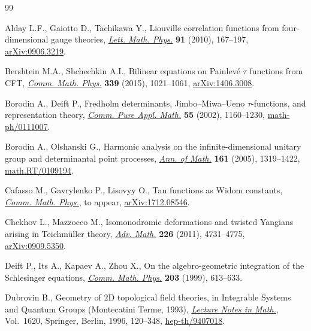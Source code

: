 \documentclass[pdftex]{sigma}
\numberwithin{equation}{section}
\begin{document}
\begin{thebibliography}{99}
\footnotesize\itemsep=0pt

Alday L.F., Gaiotto D., Tachikawa Y., Liouville correlation functions from
 four-dimensional gauge theories, \href{https://doi.org/10.1007/s11005-010-0369-5}{\textit{Lett. Math. Phys.}} \textbf{91}
 (2010), 167--197, \href{https://arxiv.org/abs/0906.3219}{arXiv:0906.3219}.

Bershtein M.A., Shchechkin A.I., Bilinear equations on {P}ainlev\'{e} {$\tau$}
 functions from {CFT}, \href{https://doi.org/10.1007/s00220-015-2427-4}{\textit{Comm. Math. Phys.}} \textbf{339} (2015),
 1021--1061, \href{https://arxiv.org/abs/1406.3008}{arXiv:1406.3008}.

Borodin A., Deift P., Fredholm determinants, {J}imbo--{M}iwa--{U}eno
 {$\tau$}-functions, and representation theory, \href{https://doi.org/10.1002/cpa.10042}{\textit{Comm. Pure Appl.
 Math.}} \textbf{55} (2002), 1160--1230, \href{https://arxiv.org/abs/math-ph/0111007}{math-ph/0111007}.

Borodin A., Olshanski G., Harmonic analysis on the infinite-dimensional unitary
 group and determinantal point processes, \href{https://doi.org/10.4007/annals.2005.161.1319}{\textit{Ann. of Math.}} \textbf{161}
 (2005), 1319--1422, \href{https://arxiv.org/abs/math.RT/0109194}{math.RT/0109194}.

Cafasso M., Gavrylenko P., Lisovyy O., Tau functions as {W}idom constants,
 \href{https://doi.org/10.1007/s00220-018-3230-9}{\textit{Comm. Math. Phys.}}, {t}o appear, \href{https://arxiv.org/abs/1712.08546}{arXiv:1712.08546}.

Chekhov L., Mazzocco M., Isomonodromic deformations and twisted {Y}angians
 arising in {T}eichm\"{u}ller theory, \href{https://doi.org/10.1016/j.aim.2010.12.017}{\textit{Adv. Math.}} \textbf{226} (2011),
 4731--4775, \href{https://arxiv.org/abs/0909.5350}{arXiv:0909.5350}.

Deift P., Its A., Kapaev A., Zhou X., On the algebro-geometric integration of
 the {S}chlesinger equations, \href{https://doi.org/10.1007/s002200050037}{\textit{Comm. Math. Phys.}} \textbf{203} (1999),
 613--633.

Dubrovin B., Geometry of {$2$}{D} topological field theories, in Integrable
 Systems and Quantum Groups ({M}ontecatini {T}erme, 1993), \href{https://doi.org/10.1007/BFb0094793}{\textit{Lecture
 Notes in Math.}}, Vol.~1620, Springer, Berlin, 1996, 120--348,
 \href{https://arxiv.org/abs/hep-th/9407018}{hep-th/9407018}.


\end{thebibliography}
\end{document}

